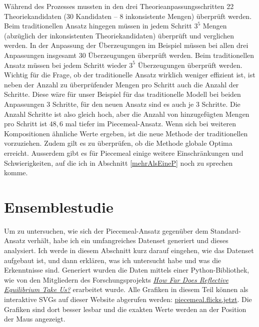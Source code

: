 \documentclass{article}
\begin{document}
 Während des Prozesses mussten in den drei Theorieanpassungsschritten 22 Theoriekandidaten (30 Kandidaten -- 8 inkonsistente Mengen) überprüft werden. Beim traditionellen Ansatz hingegen müssen in jedem Schritt $3^5$ Mengen (abzüglich der inkonsistenten Theoriekandidaten) überprüft und verglichen werden. In der Anpassung der Überzeugungen im Beispiel müssen bei allen drei Anpassungen insgesamt 30 Überzeugungen überprüft werden. Beim traditionellen Ansatz müssen bei jedem Schritt wieder $3^5$ Überzeugungen überprüft werden. Wichtig für die Frage, ob der traditionelle Ansatz wirklich weniger effizient ist, ist neben der Anzahl zu überprüfender Mengen pro Schritt auch die Anzahl der Schritte. Diese wäre für unser Beispiel für das traditionelle Modell bei beiden Anpassungen 3 Schritte, für den neuen Ansatz sind es auch je 3 Schritte. Die Anzahl Schritte ist also gleich hoch, aber die Anzahl von hinzugefügten Mengen pro Schritt ist $48,6$ mal tiefer im Piecemeal-Ansatz. Wenn sich bei weiteren Kompositionen ähnliche Werte ergeben, ist die neue Methode der traditionellen vorzuziehen. Zudem gilt es zu überprüfen, ob die Methode globale Optima erreicht. Ausserdem gibt es für Piecemeal einige weitere Einschränkungen und Schwierigkeiten, auf die ich in Abschnitt \ref{mehrAlsEineP} noch zu sprechen komme.

\section{Ensemblestudie} \label{Ensemblestudie}

Um zu untersuchen, wie sich der Piecemeal-Ansatz gegenüber dem Standard-Ansatz verhält, habe ich ein umfangreiches Datenset generiert und dieses analysiert. Ich werde in diesem Abschnitt kurz darauf eingehen, wie das Datenset aufgebaut ist, und dann erklären, was ich untersucht habe und was die Erkenntnisse sind. Generiert wurden die Daten mittels einer Python-Bibliothek, wie von den Mitgliedern des Forschungsprojekts \href{https://www.philosophie.unibe.ch/forschung/forschungsprojekte/how_far_does_reflective_equilibrium_take_us/project/index_ger.html}{\textit{How Far Does Reflective Equilibrium Take Us?}} erarbeitet wurde. Alle Grafiken in diesem Teil können als interaktive SVGs auf dieser Website abgerufen werden: \href{https://piecemeal.flicks.jetzt/}{piecemeal.flicks.jetzt}. Die Grafiken sind dort besser lesbar und die exakten Werte werden an der Position der Maus angezeigt.
\end{document}
